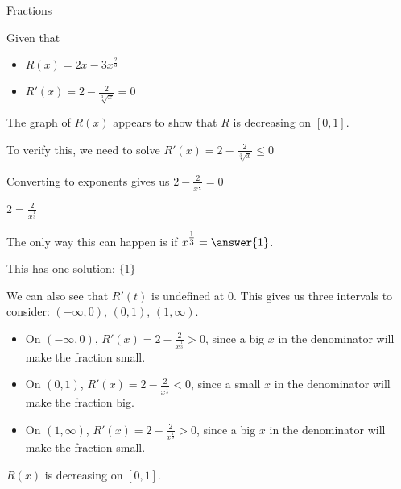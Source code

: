 \documentclass{ximera}
\begin{document}
\begin{example}  Fractions


Given that

\begin{itemize}
\item $R(x) = 2x - 3 x^{\tfrac{2}{3}}$
\item $R'(x) = 2 - \frac{2}{\sqrt[3]{x}} = 0$
\end{itemize}


The graph of $R(x)$ appears to show that $R$ is decreasing on $[0, 1]$.
\begin{center}
\end{center}










To verify this, we need to solve $R'(x) = 2 - \frac{2}{\sqrt[3]{x}}  \leq 0$



\begin{explanation}


Converting to exponents gives us $2 - \frac{2}{x^{\tfrac{1}{3}}} = 0$


$2 = \frac{2}{x^{\tfrac{1}{3}}}$

The only way this can happen is if $x^{\tfrac{1}{3}} = \answer{1}$.

This has one solution: $\{  1  \}$



We can also see that $R'(t)$ is undefined at $0$.  This gives us three intervals to consider: $(-\infty, 0)$, $(0, 1)$, $(1, \infty)$.



\begin{itemize}
\item On $(-\infty, 0)$, $R'(x) = 2 - \frac{2}{x^{\tfrac{1}{3}}} > 0$, since a big $x$ in the denominator will make the fraction small.
\item On $(0,1)$, $R'(x) = 2 - \frac{2}{x^{\tfrac{1}{3}}} < 0$, since a small $x$ in the denominator will make the fraction big.
\item On $(1,\infty)$, $R'(x) = 2 - \frac{2}{x^{\tfrac{1}{3}}} > 0$, since a big $x$ in the denominator will make the fraction small.
\end{itemize}


$R(x)$ is decreasing on $[0,1]$.


\end{explanation}
\end{example}
\end{document}
